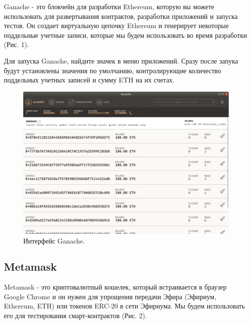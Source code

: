 \documentclass{article}
\begin{document}
Ganache - это блокчейн для разработки Ethereum, которую вы можете использовать для развертывания контрактов, разработки приложений и запуска тестов. Он создает виртуальную цепочку Ethereum и генерирует некоторые поддельные учетные записи, которые мы будем использовать во время разработки (Рис. 1).

Для запуска Ganache, найдите значек в меню приложений. Сразу после запука будут установлены значения по умолчанию, контролирующие количество поддельных учетных записей и сумму ETH на их счетах.

\begin{figure}
    \centering
    \includegraphics[scale=0.4]{ganache_1}
    \caption{Интерфейс Ganache.}
    \label{fig:ganache_1}
\end{figure}

\subsection{Metamask}

Metamask -  это криптовалютный кошелек, который встраивается в браузер Google Chrome и он нужен для упрощения передачи Эфира (Эфириум,  Ethereum, ETH)  или токенов ERC-20  в сети Эфириума. Мы будем использовать его для тестирования смарт-контрактов (Рис. 2).
\end{document}

